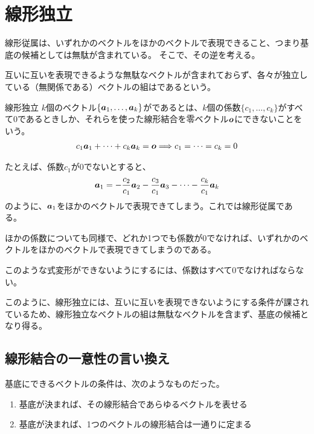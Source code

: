 \documentclass[../../../topic_linear-algebra]{subfiles}
\begin{document}
\sectionline
\section{線形独立}

線形従属は、いずれかのベクトルをほかのベクトルで表現できること、つまり基底の候補としては無駄が含まれている。
そこで、その逆を考える。

\br

互いに互いを表現できるような無駄なベクトルが含まれておらず、各々が独立している（無関係である）ベクトルの組はであるという。

\begin{definition*}{線形独立}
  $k$個のベクトル$\{ \vb*{a}_1, \ldots, \vb*{a}_k \}$がであるとは、$k$個の係数$\{c_1, \ldots, c_k\}$がすべて$0$であるときしか、それらを使った線形結合を零ベクトル$\vb*{o}$にできないことをいう。
  \begin{gather*}
    c_1 \vb*{a}_1 + \cdots + c_k\vb*{a}_{k} = \vb*{o} \Longrightarrow c_1 = \cdots = c_k = 0
  \end{gather*}
\end{definition*}

たとえば、係数$c_1$が$0$でないとすると、
\begin{equation*}
  \vb*{a}_1 = -\frac{c_2}{c_1} \vb*{a}_2 - \frac{c_3}{c_1} \vb*{a}_3 - \cdots - \frac{c_k}{c_1} \vb*{a}_{k}
\end{equation*}
のように、$\vb*{a}_1$をほかのベクトルで表現できてしまう。これでは線形従属である。

ほかの係数についても同様で、どれか1つでも係数が$0$でなければ、いずれかのベクトルをほかのベクトルで表現できてしまうのである。

このような式変形ができないようにするには、係数はすべて$0$でなければならない。

\br

このように、線形独立には、互いに互いを表現できないようにする条件が課されているため、線形独立なベクトルの組は無駄なベクトルを含まず、基底の候補となり得る。

\subsection{線形結合の一意性の言い換え}

基底にできるベクトルの条件は、次のようなものだった。

\begin{enumerate}[label=\romanlabel]
  \item 基底が決まれば、その線形結合であらゆるベクトルを表せる
  \item 基底が決まれば、1つのベクトルの線形結合は一通りに定まる
\end{enumerate}
\end{document}
